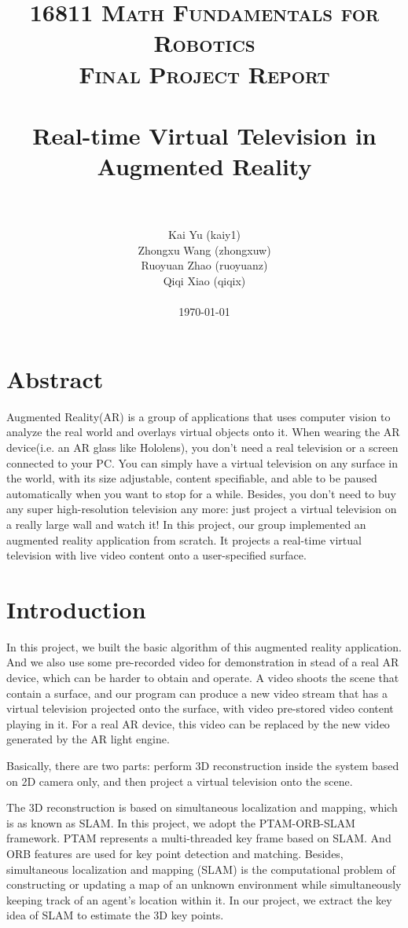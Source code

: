 \documentclass[paper=a4, fontsize=14pt]{scrartcl}
\title{
        \usefont{OT1}{bch}{b}{n}
        \normalfont \normalsize \textsc{16811 Math Fundamentals for Robotics\\
        Final Project Report} \\ [25pt]
        \horrule{0.5pt} \\[0.4cm]
        \huge Real-time Virtual Television in Augmented Reality \\
        \horrule{2pt} \\[0.5cm]
}
\author{
        \normalfont
        Kai Yu (kaiy1)\\
        Zhongxu Wang (zhongxuw)\\
        Ruoyuan Zhao (ruoyuanz)\\
        Qiqi Xiao (qiqix)\\[-3pt]       
        \\
        \normalsize
        \today
}
\date{}
\numberwithin{equation}{section}        %
\numberwithin{figure}{section}          %
\numberwithin{table}{section}               %
\begin{document}
\maketitle
\section{Abstract}

Augmented Reality(AR) is a group of applications that uses computer vision to analyze the real world and overlays virtual objects onto it. 
When wearing the AR device(i.e. an AR glass like Hololens), you don't need a real television or a screen connected to your PC. 
You can simply have a virtual television on any surface in the world, with its size adjustable, content specifiable, and able to be paused automatically when you want to stop for a while.
Besides, you don't need to buy any super high-resolution television any more: just project a virtual television on a really large wall and watch it!
In this project, our group implemented an augmented reality application from scratch. 
It projects a real-time virtual television with live video content onto a user-specified surface. 

\newpage
\section{Introduction}\label{intro}
In this project, we built the basic algorithm of this augmented reality application.
And we also use some pre-recorded video for demonstration in stead of a real AR device, which can be harder to obtain and operate. 
A video shoots the scene that contain a surface, and our program can produce a new video stream that has a virtual television projected onto the surface, with video pre-stored video content playing in it.
For a real AR device, this video can be replaced by the new video generated by the AR light engine.

Basically, there are two parts: perform 3D reconstruction inside the system based on 2D camera only, and then project a virtual television onto the scene. 

The 3D reconstruction is based on simultaneous localization and mapping, which is as known as SLAM. In this project, we adopt the PTAM-ORB-SLAM framework. 
PTAM represents a multi-threaded key frame based on SLAM.
And ORB features are used for key point detection and matching. Besides, simultaneous localization and mapping (SLAM) is the computational problem of constructing or updating a map of an unknown environment while simultaneously keeping track of an agent's location within it. 
In our project, we extract the key idea of SLAM to estimate the 3D key points.
\end{document}
